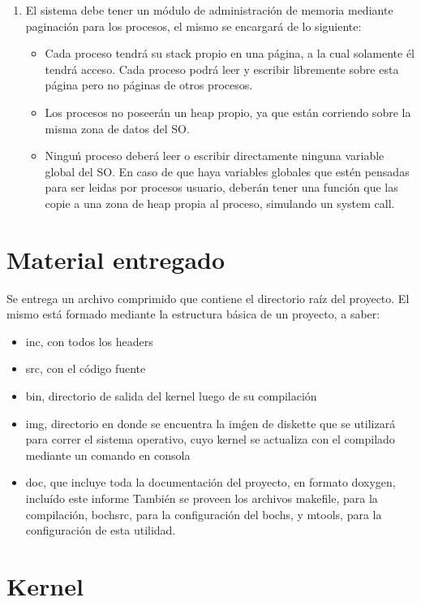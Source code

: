 \documentclass[10pt,a4paper]{article}
\begin{document}
\begin{enumerate}
			\item El sistema debe tener un m\'odulo de administraci\'on de memoria mediante paginaci\'on para los procesos, el mismo se encargar\'a de lo siguiente:
			\begin{itemize}
				\item Cada proceso tendr\'a su stack propio en una p\'agina, a la cual solamente \'el tendr\'a acceso. Cada proceso podr\'a leer y escribir libremente sobre esta p\'agina pero no p\'aginas de otros procesos.
				\item Los procesos no poseer\'an un heap propio, ya que est\'an corriendo sobre la misma zona de datos del SO.
				\item Ningu\'n proceso deber\'a leer o escribir directamente ninguna variable global del SO. En caso de que haya variables globales que est\'en pensadas para ser leidas por procesos usuario, deber\'an tener una funci\'on que las copie a una zona de heap propia al proceso, simulando un system call.
			\end{itemize}
		\end{enumerate}

\section{Material entregado}
	Se entrega un archivo comprimido que contiene el directorio ra\'iz del proyecto. El mismo est\'a formado mediante la estructura b\'asica de un proyecto, a saber:
	\begin{itemize}
		\item inc, con todos los headers
		\item src, con el c\'odigo fuente
		\item bin, directorio de salida del kernel luego de su compilaci\'on
		\item img, directorio en donde se encuentra la im\'gen de diskette que se utilizar\'a para correr el sistema operativo, cuyo kernel se actualiza con el compilado mediante un comando en consola
		\item doc, que incluye toda la documentaci\'on del proyecto, en formato doxygen, inclu\'ido este informe
	Tambi\'en se proveen los archivos makefile, para la compilaci\'on, bochsrc, para la configuraci\'on del bochs, y mtools, para la configuraci\'on de esta utilidad.
	\end{itemize}

\section{Kernel}
\end{document}
